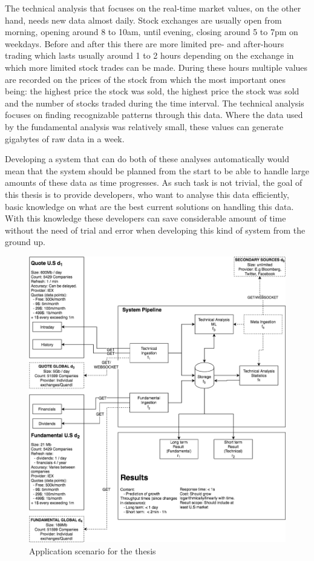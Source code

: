 The technical analysis that focuses on the real-time market values, on the other hand, needs new data almost daily.
Stock exchanges are usually open from morning, opening around 8 to 10am, until evening, closing around 5 to 7pm on weekdays.
Before and after this there are more limited pre- and after-hours trading which lasts usually around 1 to 2 hours depending on the exchange in which more limited stock trades can be made.
During these hours multiple values are recorded on the prices of the stock from which the most important ones being: the highest price the stock was sold, the highest price the stock was sold and the number of stocks traded during the time interval.
The technical analysis focuses on finding recognizable patterns through this data. \cite{murphy}
Where the data used by the fundamental analysis was relatively small, these values can generate gigabytes of raw data in a week.

Developing a system that can do both of these analyses automatically would mean that the system should be planned from the start to be able to handle large amounts of these data as time progresses.
As such task is not trivial, the goal of this thesis is to provide developers, who want to analyse this data efficiently, basic knowledge on what are the best current solutions on handling this data.
With this knowledge these developers can save considerable amount of time without the need of trial and error when developing this kind of system from the ground up.

\begin{figure}[ht]
    \includegraphics[scale=0.36]{images/system2} 
    \centering
    \caption{Application scenario for the thesis}
\end{figure}

